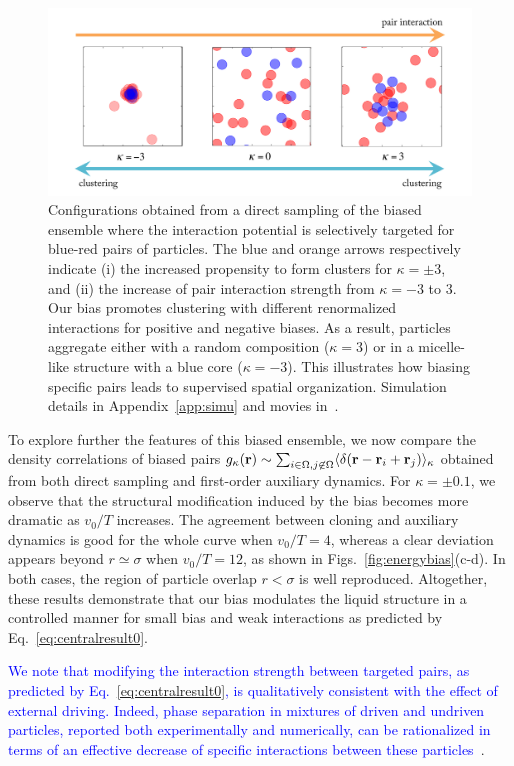 \documentclass[superscriptaddress, twocolumn, prx, longbibliography, nofootinbib]{revtex4-1}
\begin{document}
\begin{figure}
	\centering
	\includegraphics[width=.9\linewidth]{fig4.pdf}
	\caption{\label{fig:outofperturbation}
	Configurations obtained from a direct sampling of the biased ensemble where the interaction potential is selectively targeted for blue-red pairs of particles. The blue and orange arrows respectively indicate (i) the increased propensity to form clusters for $\kappa=\pm3$, and (ii) the increase of pair interaction strength from $\kappa=-3$ to $3$. Our bias promotes clustering with different renormalized interactions for positive and negative biases. As a result, particles aggregate either with a random composition ($\kappa=3$) or in a micelle-like structure with a blue core ($\kappa=-3$). This illustrates how biasing specific pairs leads to supervised spatial organization.
		Simulation details in Appendix~\ref{app:simu} and movies in~\cite{movie}.
	}
\end{figure}


To explore further the features of this biased ensemble, we now compare the density correlations of biased pairs $g_\kappa({\bf r})\sim \sum_{i\in\Omega,j\not\in\Omega}\langle \delta({\bf r}-{\bf r}_i+{\bf r}_j)\rangle_\kappa$ obtained from both direct sampling and first-order auxiliary dynamics. For $\kappa=\pm0.1$, we observe that the structural modification induced by the bias becomes more dramatic as $v_0/T$ increases. The agreement between cloning and auxiliary dynamics is good for the whole curve when $v_0/T=4$, whereas a clear deviation appears beyond $r\simeq\sigma$ when $v_0/T=12$, as shown in Figs.~\ref{fig:energybias}(c-d). In both cases, the region of particle overlap $r<\sigma$ is well reproduced. Altogether, these results demonstrate that our bias modulates the liquid structure in a controlled manner for small bias and weak interactions as predicted by Eq.~\ref{eq:centralresult0}.

\textcolor{blue}{We note that modifying the interaction strength between targeted pairs, as predicted by Eq.~\ref{eq:centralresult0}, is qualitatively consistent with the effect of external driving. Indeed, phase separation in mixtures of driven and undriven particles, reported both experimentally and numerically, can be rationalized in terms of an effective decrease of specific interactions between these particles~\cite{delJunco2018,Han2016}}.
\end{document}
